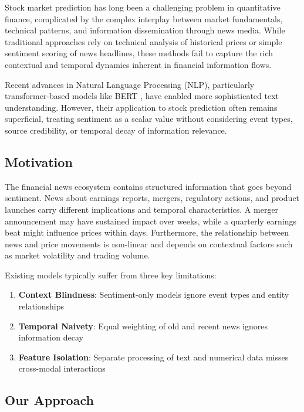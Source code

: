 \documentclass[conference]{IEEEtran}
\begin{document}
Stock market prediction has long been a challenging problem in quantitative finance, complicated by the complex interplay between market fundamentals, technical patterns, and information dissemination through news media. While traditional approaches rely on technical analysis of historical prices or simple sentiment scoring of news headlines, these methods fail to capture the rich contextual and temporal dynamics inherent in financial information flows.

Recent advances in Natural Language Processing (NLP), particularly transformer-based models like BERT \cite{devlin2018bert}, have enabled more sophisticated text understanding. However, their application to stock prediction often remains superficial, treating sentiment as a scalar value without considering event types, source credibility, or temporal decay of information relevance.

\subsection{Motivation}

The financial news ecosystem contains structured information that goes beyond sentiment. News about earnings reports, mergers, regulatory actions, and product launches carry different implications and temporal characteristics. A merger announcement may have sustained impact over weeks, while a quarterly earnings beat might influence prices within days. Furthermore, the relationship between news and price movements is non-linear and depends on contextual factors such as market volatility and trading volume.

Existing models typically suffer from three key limitations:

\begin{enumerate}
    \item \textbf{Context Blindness}: Sentiment-only models ignore event types and entity relationships
    \item \textbf{Temporal Naivety}: Equal weighting of old and recent news ignores information decay
    \item \textbf{Feature Isolation}: Separate processing of text and numerical data misses cross-modal interactions
\end{enumerate}

\subsection{Our Approach}
\end{document}

